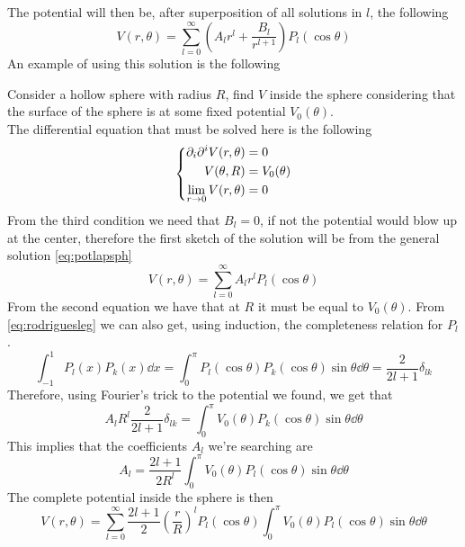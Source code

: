 \documentclass[../electromagnetism]{subfiles}
\begin{document}
The potential will then be, after superposition of all solutions in $l$, the following
\begin{equation}
	V(r,\theta)=\sum_{l=0}^\infty\left( A_lr^l+\frac{B_l}{r^{l+1}} \right)P_l(\cos\theta)
	\label{eq:potlapsph}
\end{equation}
An example of using this solution is the following
\begin{eg}
	Consider a hollow sphere with radius $R$, find $V$ inside the sphere considering that the surface of the sphere is at some fixed potential $V_0(\theta)$.\\
	The differential equation that must be solved here is the following
	\begin{equation*}
		\left\{ \begin{aligned}
				\partial_i\partial^iV(r,\theta)&=0\\
				V(\theta,R)&=V_0(\theta)\\
				\lim_{r\to0}V(r,\theta)&=0
		\end{aligned}\right.
	\end{equation*}
	From the third condition we need that $B_l=0$, if not the potential would blow up at the center, therefore the first sketch of the solution will be from the general solution \eqref{eq:potlapsph}
	\begin{equation*}
		V(r,\theta)=\sum_{l=0}^\infty A_lr^lP_l(\cos\theta)
	\end{equation*}
	From the second equation we have that at $R$ it must be equal to $V_0(\theta)$. From \eqref{eq:rodriguesleg} we can also get, using induction, the completeness relation for $P_l$.
	\begin{equation}
		\int_{-1}^{1}P_l(x)P_k(x)\dd x=\int_{0}^{\pi}P_l(\cos\theta)P_k(\cos\theta)\sin\theta\dd\theta=\frac{2}{2l+1}\delta_{lk}
		\label{eq:completenesslegendre}
	\end{equation}
	Therefore, using Fourier's trick to the potential we found, we get that
	\begin{equation*}
		A_lR^l\frac{2}{2l+1}\delta_{lk}=\int_{0}^{\pi}V_0(\theta)P_k(\cos\theta)\sin\theta\dd\theta
	\end{equation*}
	This implies that the coefficients $A_l$ we're searching are
	\begin{equation*}
		A_l=\frac{2l+1}{2R^l}\int_{0}^{\pi}V_0(\theta)P_l(\cos\theta)\sin\theta\dd\theta
	\end{equation*}
	The complete potential inside the sphere is then
	\begin{equation*}
		V(r,\theta)=\sum_{l=0}^\infty\frac{2l+1}{2}\left( \frac{r}{R} \right)^lP_l(\cos\theta)\int_{0}^{\pi}V_0(\theta)P_l(\cos\theta)\sin\theta\dd\theta
	\end{equation*}
\end{eg}
%
\end{document}

